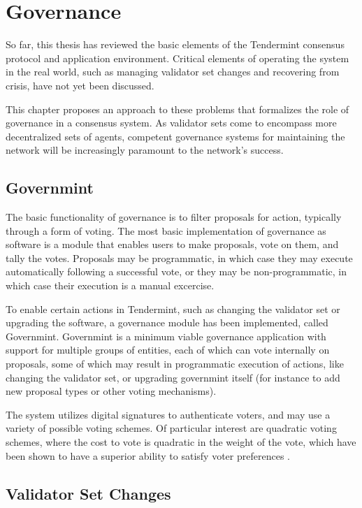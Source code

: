 \chapter{Governance}
\label{ch:governance}

So far, this thesis has reviewed the basic elements of the Tendermint consensus protocol and application environment.
Critical elements of operating the system in the real world, such as managing validator set changes
and recovering from crisis, have not yet been discussed. 

This chapter proposes an approach to these problems that formalizes the role of governance in a consensus system.
As validator sets come to encompass more decentralized sets of agents, competent governance systems 
for maintaining the network will be increasingly paramount to the network's success.

\section{Governmint}

The basic functionality of governance is to filter proposals for action, typically through a form of voting.
The most basic implementation of governance as software is a module that enables users to make proposals,
vote on them, and tally the votes. 
Proposals may be programmatic, in which case they may execute automatically following a successful vote,
or they may be non-programmatic, in which case their execution is a manual excercise.

To enable certain actions in Tendermint, such as changing the validator set or upgrading the software,
a governance module has been implemented, called Governmint.
Governmint is a minimum viable governance application with support for multiple groups of entities,
each of which can vote internally on proposals, some of which may result in programmatic execution of actions,
like changing the validator set, or upgrading governmint itself (for instance to add new proposal types or other voting mechanisms).

The system utilizes digital signatures to authenticate voters, 
and may use a variety of possible voting schemes.
Of particular interest are quadratic voting schemes,
where the cost to vote is quadratic in the weight of the vote,
which have been shown to have a superior ability to satisfy voter preferences \cite{posner2013quadratic}.

\section{Validator Set Changes}

